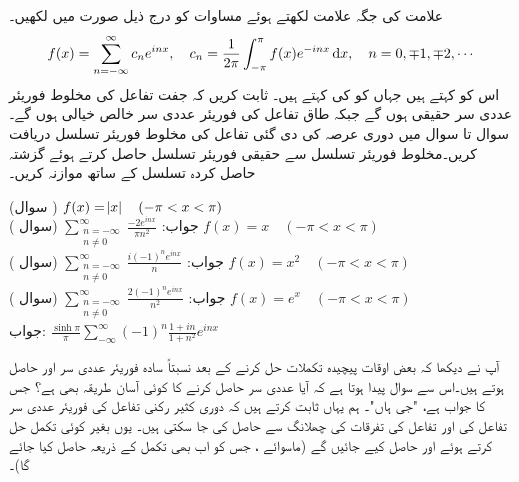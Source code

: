 علامت  کی جگہ علامت  لکھتے  ہوئے مساوات  کو درج ذیل صورت میں لکھیں۔
\begin{align}\label{مساوات_فوریئر_مخلوط_ب}
f(x)=\sum_{n=-\infty}^{\infty} c_ne^{inx},\quad c_n=\frac{1}{2\pi}\int_{-\pi}^{\pi} f(x)e^{-inx}\dif x,\quad n=0,\mp 1,\mp 2,\cdots
\end{align}
اس کو  کہتے ہیں جہاں   کو  کی  کہتے ہیں۔
ثابت کریں کہ جفت تفاعل کی مخلوط فوریئر عددی سر حقیقی ہوں گے جبکہ طاق تفاعل کی فوریئر عددی سر خالص خیالی ہوں گے۔
سوال  تا سوال  میں دوری عرصہ  کی دی گئی تفاعل  کی مخلوط فوریئر تسلسل دریافت کریں۔مخلوط فوریئر تسلسل سے حقیقی فوریئر تسلسل حاصل کرتے ہوئے  گزشتہ حاصل کردہ تسلسل کے ساتھ موازنہ کریں۔

\quad (سوال )
$f(x)=\abs{x}\quad (-\pi<x<\pi)$\\
جواب:\quad
$\sum\limits_{\substack{ n=-\infty\\ n\ne 0}}^{\infty} {\frac{-2 e^{inx}}{\pi n^2}}$
\quad (سوال )
$f(x)=x\quad (-\pi<x<\pi)$\\
جواب:\quad
$\sum\limits_{\substack{ n=-\infty\\ n\ne 0}}^{\infty} {\frac{i (-1)^n e^{inx}}{n}}$
\quad (سوال )
$f(x)=x^2\quad (-\pi<x<\pi)$\\
جواب:\quad
$\sum\limits_{\substack{ n=-\infty\\ n\ne 0}}^{\infty} {\frac{2(-1)^n e^{inx}}{n^2}}$
\quad (سوال )
$f(x)=e^x\quad (-\pi<x<\pi)$\\
جواب:\quad
$\frac{\sinh \pi}{\pi}\sum\limits_{-\infty}^{\infty} (-1)^n \frac{1+i n}{1+n^2}e^{inx}$

آپ نے دیکھا کہ  بعض اوقات پیچیدہ تکملات حل کرنے کے بعد نسبتاً سادہ فوریئر عددی سر  اور  حاصل ہوتے ہیں۔اس سے سوال پیدا ہوتا ہے کہ آیا عددی سر حاصل کرنے کا کوئی آسان طریقہ بھی ہے؟ جس کا جواب ہے، "جی ہاں"۔ ہم یہاں ثابت کرتے ہیں کہ دوری کثیر رکنی تفاعل کی فوریئر عددی سر تفاعل کی اور تفاعل کی تفرقات کی چھلانگ سے حاصل کی جا سکتی ہیں۔ یوں بغیر کوئی تکمل حل کرتے ہوئے  اور  حاصل کیے جائیں گے (ماسوائے ، جس کو اب بھی تکمل کے ذریعہ حاصل کیا جائے گا)۔

